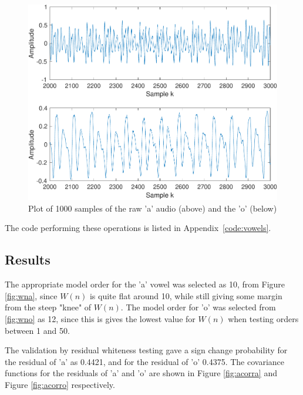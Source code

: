 \documentclass{IEEEtran}
\begin{document}
\begin{figure}[h!]
    \centering
    \captionsetup{justification=centering}
    \includegraphics[width=0.8\columnwidth]{pictures/raw_o_audio.pdf}
    \caption{Plot of 1000 samples of the raw 'a' audio (above) and the 'o'
    (below)}
    \label{fig:rawaudio}
\end{figure}

The code performing these operations is listed in Appendix~\ref{code:vowels}.

\subsection{Results}

The appropriate model order for the 'a' vowel was selected as 10, from Figure
\ref{fig:wna}, since $W(n)$ is quite flat around 10, while still giving some
margin from the steep "knee" of $W(n)$. The model order for 'o' was selected
from \ref{fig:wno} as 12, since this is gives the lowest value for $W(n)$ 
when testing orders between 1 and 50.

The validation by residual whiteness testing gave a sign change probability for
the residual of 'a' as 0.4421, and for the residual of 'o' 0.4375. The
covariance functions for the
residuals of 'a' and 'o' are shown in Figure \ref{fig:acorra} and Figure
\ref{fig:acorro} respectively.
\end{document}
